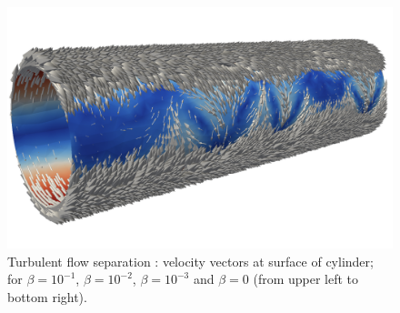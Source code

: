 \begin{figure}
  \includegraphics[width=\twofigs]{chapters/hoffman-1/png/Hoffman_fig2d.png}
  \caption{Turbulent flow separation \citep{HoffmanJansson2009}: velocity
    vectors at surface of cylinder; for $\beta = 10^{-1}$, $\beta = 10^{-2}$,
    $\beta = 10^{-3}$ and $\beta = 0$ (from upper left to bottom right).}
  \label{hoffman-1:fig:1}
\end{figure}

